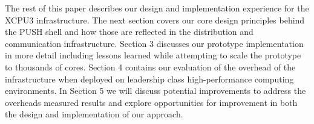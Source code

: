 The rest of this paper describes our design and implementation experience
for the XCPU3 infrastructure. The next section 
covers our core design principles behind the PUSH shell and how those are
reflected in the distribution and communication infrastructure.
Section 3 discusses our prototype implementation in more detail including
lessons learned while attempting to scale the prototype to thousands of cores.
Section 4 contains our evaluation of the overhead of the infrastructure 
when deployed on leadership class high-performance computing environments.
In Section 5 we will discuss potential improvements to address the overheads
measured results and explore opportunities for improvement in both the design 
and implementation of our approach.

